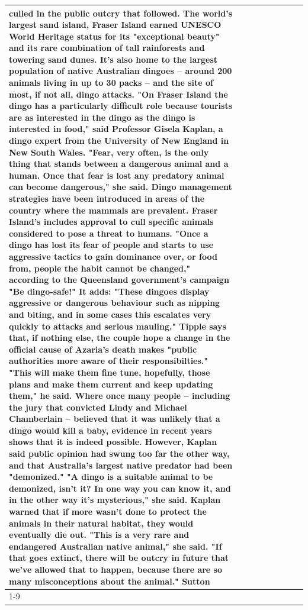 \begin{table}[H]
\begin{tabular}{lllrlllll}
culled in the public outcry that followed. The world's largest sand island, Fraser Island earned UNESCO World Heritage status for its "exceptional beauty" and its rare combination of tall rainforests and towering sand dunes. It's also home to the largest population of native Australian dingoes -- around 200 animals living in up to 30 packs -- and the site of most, if not all, dingo attacks. "On Fraser Island the dingo has a particularly difficult role because tourists are as interested in the dingo as the dingo is interested in food," said Professor Gisela Kaplan, a dingo expert from the University of New England in New South Wales. "Fear, very often, is the only thing that stands between a dangerous animal and a human. Once that fear is lost any predatory animal can become dangerous," she said. Dingo management strategies have been introduced in areas of the country where the mammals are prevalent. Fraser Island's includes approval to cull specific animals considered to pose a threat to humans. "Once a dingo has lost its fear of people and starts to use aggressive tactics to gain dominance over, or food from, people the habit cannot be changed," according to the Queensland government's campaign "Be dingo-safe!" It adds: "These dingoes display aggressive or dangerous behaviour such as nipping and biting, and in some cases this escalates very quickly to attacks and serious mauling." Tipple says that, if nothing else, the couple hope a change in the official cause of Azaria's death makes "public authorities more aware of their responsibilties." "This will make them fine tune, hopefully, those plans and make them current and keep updating them," he said. Where once many people -- including the jury that convicted Lindy and Michael Chamberlain -- believed that it was unlikely that a dingo would kill a baby, evidence in recent years shows that it is indeed possible. However, Kaplan said public opinion had swung too far the other way, and that Australia's largest native predator had been "demonized." "A dingo is a suitable animal to be demonized, isn't it? In one way you can know it, and in the other way it's mysterious," she said. Kaplan warned that if more wasn't done to protect the animals in their natural habitat, they would eventually die out. "This is a very rare and endangered Australian native animal," she said. "If that goes extinct, there will be outcry in future that we've allowed that to happen, because there are so many misconceptions about the animal." Sutton \\
\cline{1-9}

\end{tabular}
\end{table}
